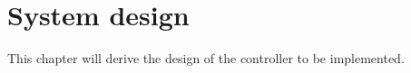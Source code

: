 \chapter{System design}
\label{sec:system_design}
This chapter will derive the design of the controller to be implemented.